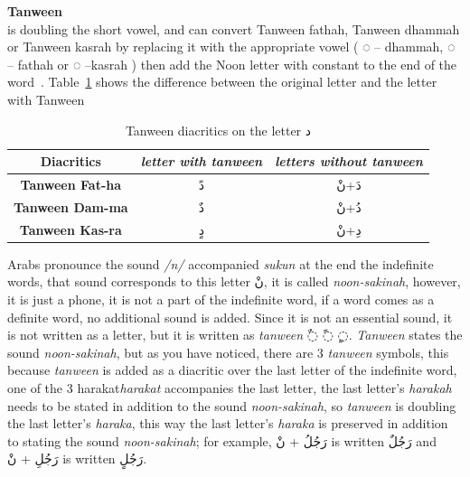 \begin{definition}\label{def:tanween_definition}
  \textbf{Tanween} \hfill \\
  is doubling the short vowel, and can convert
Tanween fathah, Tanween dhammah or Tanween kasrah by
replacing it with the appropriate vowel ( ُ◌ – dhammah, َ◌ –
fathah or ِ◌ –kasrah ) then add the Noon letter with constant to the end of the word~\cite{Alnagdawi2013}. Table~\ref{tables:Tanween_dal}
shows the difference between the original letter and the letter with Tanween

\begin{table}[H]
	\centering
	\begin{tabular}{c c c}
		\toprule
		\textbf{\small{Diacritics}} & \small{\textit{letter with tanween }} & \small{\textit{letters without tanween}} \\
		\midrule

          \textbf{\small{Tanween Fat-ha}}  & \textarabic{دً} &  \textarabic{دَ+نْ}\\
          \textbf{\small{Tanween Dam-ma}}  & \textarabic{دٌ} &  \textarabic{دُ+نْ}\\
          \textbf{\small{Tanween Kas-ra}}  & \textarabic{دٍ} &  \textarabic{دِ+نْ}\\


		\bottomrule
	\end{tabular}
	\caption{Tanween diacritics on the letter  \textarabic{ د }} \label{tables:Tanween_dal}
\end{table}


\end{definition}

 Arabs pronounce the sound \textit{/n/} accompanied \textit{sukun} at the end the indefinite words, that sound corresponds to this
letter \textarabic{نْ}, it is called \textit{noon-sakinah}, however, it is
just a phone, it is not a part of the indefinite word, if a word comes as a
definite word, no additional sound is added. Since it is not an essential sound,
it is not written as a letter, but it is written as  \textit{tanween}
\textarabic{◌ٌ ◌ً ◌ٍ}.
\textit{Tanween} states the sound \textit{noon-sakinah}, but as you have noticed,
there are 3 \textit{tanween} symbols, this because  \textit{tanween} is added as
a diacritic over the last letter of the indefinite word, one of the 3 harakat\textit{harakat} accompanies the last letter, the last letter's \textit{harakah}
needs to be stated in addition to the sound \textit{noon-sakinah}, so
\textit{tanween} is doubling the last letter's \textit{haraka}, this way the last
letter's \textit{haraka} is preserved in addition to stating the sound
\textit{noon-sakinah}; for example, \textarabic{رَجُلُ + نْ} is written
\textarabic{رَجُلٌ} and  \textarabic{رَجُلِ + نْ} is written \textarabic{رَجُلٍ}.


